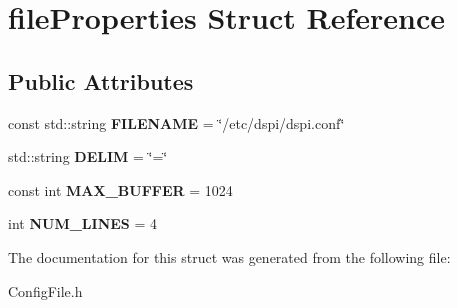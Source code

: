 \hypertarget{structfileProperties}{\section{file\-Properties Struct Reference}
\label{structfileProperties}
}
\subsection*{Public Attributes}
\begin{DoxyCompactItemize}
\item 
\hypertarget{structfileProperties_a5b99a14a31e9f8f3f1786aec04db60af}{const std\-::string {\bfseries F\-I\-L\-E\-N\-A\-M\-E} = \char`\"{}/etc/dspi/dspi.\-conf\char`\"{}}\label{structfileProperties_a5b99a14a31e9f8f3f1786aec04db60af}

\item 
\hypertarget{structfileProperties_a0ae1db25df9d14d177f0d104aeabd5c0}{std\-::string {\bfseries D\-E\-L\-I\-M} = \char`\"{}=\char`\"{}}\label{structfileProperties_a0ae1db25df9d14d177f0d104aeabd5c0}

\item 
\hypertarget{structfileProperties_a6c779ee896e4d9f211ae8f3a9a8ab848}{const int {\bfseries M\-A\-X\-\_\-\-B\-U\-F\-F\-E\-R} = 1024}\label{structfileProperties_a6c779ee896e4d9f211ae8f3a9a8ab848}

\item 
\hypertarget{structfileProperties_afd1574f0222678ac4a73f7a2df7934bb}{int {\bfseries N\-U\-M\-\_\-\-L\-I\-N\-E\-S} = 4}\label{structfileProperties_afd1574f0222678ac4a73f7a2df7934bb}

\end{DoxyCompactItemize}


The documentation for this struct was generated from the following file\-:\begin{DoxyCompactItemize}
\item 
Config\-File.\-h\end{DoxyCompactItemize}
